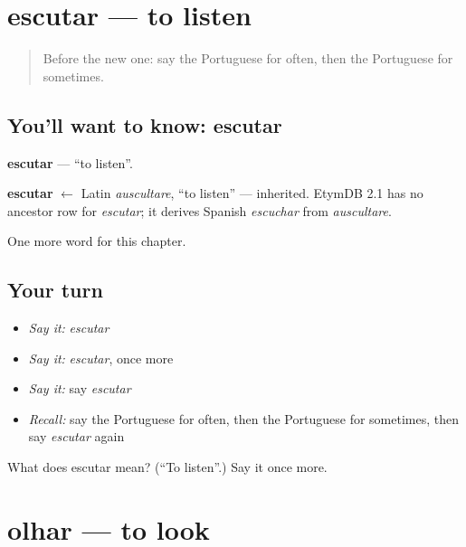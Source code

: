 \section[escutar]{escutar — to listen}

\label{lesson:PT-C129-escutar}



\begin{quote}
Before the new one: say the Portuguese for often, then the Portuguese for sometimes.
\end{quote}

\subsection*{You'll want to know: escutar}
\textbf{escutar} — \textquotedblleft{}to listen\textquotedblright{}.

\begin{cousinweb}
\textbf{escutar} $\leftarrow$ Latin \emph{auscultare}, \textquotedblleft{}to listen\textquotedblright{} — inherited. EtymDB 2.1 has no ancestor row for \emph{escutar}; it derives Spanish \emph{escuchar} from \emph{auscultare}.
\end{cousinweb}

\begin{grammarlens}[title={What you've built}]
One more word for this chapter.
\end{grammarlens}

\subsection*{Your turn}
\begin{itemize}
\raggedright
  \item \emph{Say it:} \emph{escutar}
  \item \emph{Say it:} \emph{escutar}, once more
  \item \emph{Say it:} say \emph{escutar}
  \item \emph{Recall:} say the Portuguese for often, then the Portuguese for sometimes, then say \emph{escutar} again
\end{itemize}

\begin{tcolorbox}[breakable,colback=teal!4,colframe=teal!35!black,title={Before you move on}]
What does escutar mean? (\textquotedblleft{}To listen\textquotedblright{}.) Say it once more.
\end{tcolorbox}
\section[olhar]{olhar — to look}

